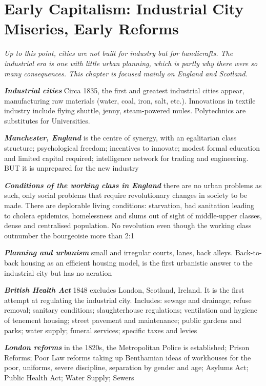 \documentclass{article}
\newcommand{\bisection}[1]{\textbf{\textit{#1}}}
\newcommand{\alignedmarginpar}[1]{%
        \marginpar{\raggedright\small #1}
    }
\begin{document}
\pagebreak
\section{Early Capitalism: Industrial City Miseries, Early Reforms}

\textit{Up to this point, cities are not built for industry but for handicrafts. The industrial era is one with little urban planning, which is partly why there were so many consequences. This chapter is focused mainly on England and Scotland.}

\bisection{Industrial cities} Circa 1835, the first and greatest industrial cities appear, manufacturing raw materials (water, coal, iron, salt, etc.). Innovations in textile industry include flying shuttle, jenny, steam-powered mules. Polytechnics are substitutes for Universities.

\bisection{Manchester, England}\alignedmarginpar{first innovative milieu} is the centre of synergy, with an egalitarian class structure; psychological freedom; incentives to innovate; modest formal education and limited capital required; intelligence network for trading and engineering. BUT it is unprepared for the new industry

\bisection{Conditions of the working class in England}\alignedmarginpar{Friedrich Engels} there are no urban problems as such, only social problems that require revolutionary changes in society to be made. There are deplorable living conditions: starvation, bad sanitation leading to cholera epidemics, homelessness and slums out of sight of middle-upper classes, dense and centralised population. No revolution even though the working class outnumber the bourgeoisie more than 2:1

\bisection{Planning and urbanism} small and irregular courts, lanes, back alleys. Back-to-back housing as an efficient housing model, is the first urbanistic answer to the industrial city but has no aeration

\bisection{British Health Act} 1848 excludes London, Scotland, Ireland. It is the first attempt at regulating the industrial city. Includes: sewage and drainage; refuse removal; sanitary conditions; slaughterhouse regulations; ventilation and hygiene of tenement housing; street pavement and maintenance; public gardens and parks; water supply; funeral services; specific taxes and levies

\bisection{London reforms} in the 1820s, the Metropolitan Police is established; Prison Reforms; Poor Law reforms taking up Benthamian ideas of workhouses for the poor, uniforms, severe discipline, separation by gender and age; Asylums Act; Public Health Act; Water Supply; Sewers
\end{document}
